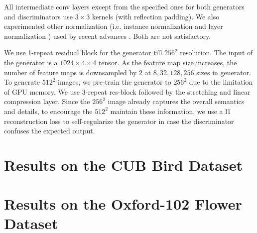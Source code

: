 \documentclass[10pt, letterpaper]{article}
\begin{document}
All intermediate conv layers except from the specified ones for both generators and discriminators use $3{\times}3$ kernels (with reflection padding).
We also experimented other normalization (i.e. instance normalization \cite{ulyanov2016instance} and layer normalization \cite{ba2016layer}) used by recent advances \cite{zhu2017unpaired,chen2017photographic}. Both are not satisfactory. 

We use 1-repeat residual block for the generator till $256^2$ resolution. The input of the generator is a $1024{\times}4{\times}4$ tensor. As the feature map size increases, the number of feature maps is downsampled by $2$ at $8, 32, 128, 256$ sizes in generator. 
To generate $512^2$ images, we pre-train the generator to $256^2$ due to the limitation of GPU memory. We use $3$-repeat res-block followed by the stretching and linear compression layer. 
Since the $256^2$ image already captures the overall semantics and details, to encourage the $512^2$ maintain these information, we use a l1 reconstruction loss to self-regularize the generator in case the discriminator confuses the expected output.

\section{Results on the CUB Bird Dataset}


\section{Results on the Oxford-102 Flower Dataset}

{\small
	
	
}
\end{document}
